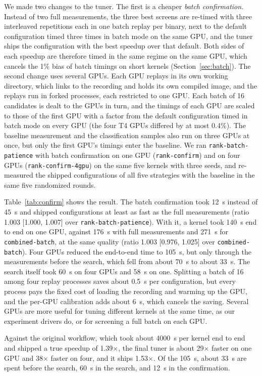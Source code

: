 \documentclass[10pt]{article}
\newcommand{\x}{\ensuremath{\times}}
\newcommand{\code}[1]{\texttt{#1}}
\begin{document}
We made two changes to the tuner. The first is a cheaper \emph{batch
confirmation}. Instead of two full measurements, the three best screens are
re-timed with three interleaved repetitions each in one batch replay per
binary, next to the default configuration timed three times in batch mode on
the same GPU, and the tuner ships the configuration with the best speedup
over that default. Both sides of each speedup are therefore timed in the same
regime on the same GPU, which cancels the 1\% bias of batch timings on short
kernels (Section~\ref{sec:batch}). The second change uses several GPUs. Each
GPU replays in its own working directory, which links to the recording and
holds its own compiled image, and the replays run in forked processes, each
restricted to one GPU. Each batch of 16 candidates is dealt to the GPUs in
turn, and the timings of each GPU are scaled to those of the first GPU with a
factor from the default configuration timed in batch mode on every GPU (the
four T4 GPUs differed by at most 0.4\%). The baseline measurement and the
classification samples also run on three GPUs at once, but only the first
GPU's timings enter the baseline. We ran \code{rank-batch-patience} with batch
confirmation on one GPU (\code{rank-confirm}) and on four GPUs
(\code{rank-confirm-4gpu}) on the same five kernels with three seeds, and
re-measured the shipped configurations of all five strategies with the
baseline in the same five randomized rounds.

Table~\ref{tab:confirm} shows the result. The batch confirmation took 12~s
instead of 45~s and shipped configurations at least as fast as the full
measurements (ratio 1.003 [1.000, 1.007] over \code{rank-batch-patience}).
With it, a kernel took 140~s end to end on one GPU, against 176~s with full
measurements and 271~s for \code{combined-batch}, at the same quality (ratio
1.003 [0.976, 1.025] over \code{combined-batch}). Four GPUs reduced the end-to-end
time to 105~s, but only through the measurements before the search, which
fell from about 70~s to about 33~s. The search itself took 60~s on four GPUs
and 58~s on one. Splitting a batch of 16 among four replay processes saves
about 0.5~s per configuration, but every process pays the fixed cost of
loading the recording and warming up the GPU, and the per-GPU calibration
adds about 6~s, which cancels the saving. Several GPUs are more useful for
tuning different kernels at the same time, as our experiment drivers do, or
for screening a full batch on each GPU.

Against the original workflow, which took about 4000~s per kernel end to end
and shipped a true speedup of 1.39\x{}, the final tuner is about 29\x{}
faster on one GPU and 38\x{} faster on four, and it ships 1.53\x{}. Of the
105~s, about 33~s are spent before the search, 60~s in the search, and 12~s
in the confirmation.
\end{document}
